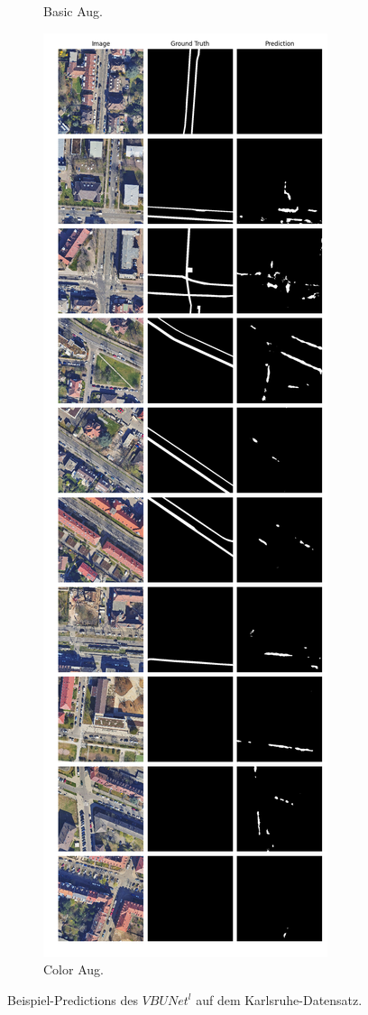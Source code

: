\begin{figure}
\begin{subfigure}{.4\textwidth}
		\caption{Basic Aug.}
	\end{subfigure}
	\begin{subfigure}{.4\textwidth}
		\centering
		\includegraphics[width=1.\textwidth]{Bilder/karlsruhe-color-samples/vbunet-l.png}
		\caption{Color Aug.}
	\end{subfigure}
	\caption{Beispiel-Predictions des $VBUNet^l$ auf dem Karlsruhe-Datensatz.}
	\label{fig:ka-samples-vbunet-l}
	\end{figure}
	
